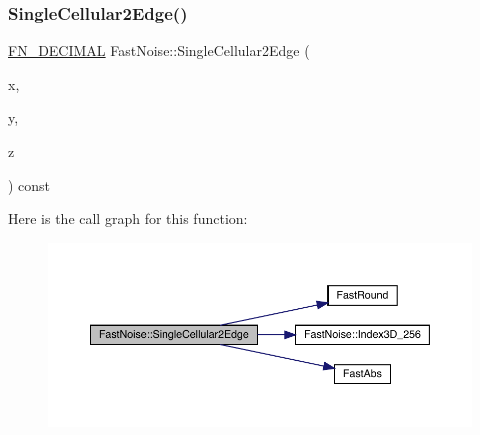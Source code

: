 \subsubsection{\texorpdfstring{Single\+Cellular2\+Edge()}{SingleCellular2Edge()}\hspace{0.1cm}{\footnotesize\ttfamily [2/2]}}
{\footnotesize\ttfamily \mbox{\hyperlink{_fast_noise_8h_a75a9ef6d2541c4921815b885bfd449c3}{F\+N\+\_\+\+D\+E\+C\+I\+M\+AL}} Fast\+Noise\+::\+Single\+Cellular2\+Edge (\begin{DoxyParamCaption}\item[{\mbox{\hyperlink{_fast_noise_8h_a75a9ef6d2541c4921815b885bfd449c3}{F\+N\+\_\+\+D\+E\+C\+I\+M\+AL}}}]{x,  }\item[{\mbox{\hyperlink{_fast_noise_8h_a75a9ef6d2541c4921815b885bfd449c3}{F\+N\+\_\+\+D\+E\+C\+I\+M\+AL}}}]{y,  }\item[{\mbox{\hyperlink{_fast_noise_8h_a75a9ef6d2541c4921815b885bfd449c3}{F\+N\+\_\+\+D\+E\+C\+I\+M\+AL}}}]{z }\end{DoxyParamCaption}) const\hspace{0.3cm}{\ttfamily [private]}}

Here is the call graph for this function\+:
\nopagebreak
\begin{figure}[H]
\begin{center}
\leavevmode
\includegraphics[width=350pt]{d1/dd8/class_fast_noise_a10e1d5c203e0d93b70f9f3aa4718e221_cgraph}
\end{center}
\end{figure}
\mbox{\label{class_fast_noise_a31ce14d8b90143da35b074d5fdeda85c}} 
